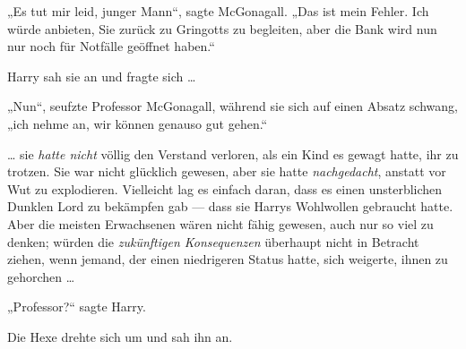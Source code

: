 „Es tut mir leid, junger Mann“, sagte McGonagall.
„Das ist mein Fehler. Ich würde anbieten, Sie zurück zu Gringotts zu begleiten, aber die Bank wird nun nur noch für Notfälle geöffnet haben.“

Harry sah sie an und fragte sich …

„Nun“, seufzte Professor McGonagall, während sie sich auf einen Absatz schwang, „ich nehme an, wir können genauso gut gehen.“

… sie \emph{hatte nicht} völlig den Verstand verloren, als ein Kind es gewagt hatte, ihr zu trotzen. Sie war nicht glücklich gewesen, aber sie hatte \emph{nachgedacht}, anstatt vor Wut zu explodieren. Vielleicht lag es einfach daran, dass es einen unsterblichen Dunklen Lord zu bekämpfen gab — dass sie Harrys Wohlwollen gebraucht hatte. Aber die meisten Erwachsenen wären nicht fähig gewesen, auch nur so viel zu denken; würden die \emph{zukünftigen Konsequenzen} überhaupt nicht in Betracht ziehen, wenn jemand, der einen niedrigeren Status hatte, sich weigerte, ihnen zu gehorchen …

„Professor?“ sagte Harry.

Die Hexe drehte sich um und sah ihn an.

